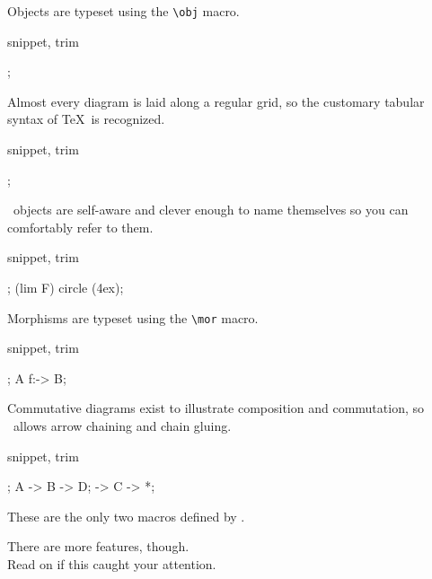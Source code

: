 Objects are typeset using the \lstinline|\obj| macro.

\begin{tcblisting}{snippet, trim}
\begin{codi}
;
\end{codi}
\end{tcblisting}

Almost every diagram is laid along a regular grid,
so the customary tabular syntax of \TeX\ is recognized.

\begin{tcblisting}{snippet, trim}
\begin{codi}
;
\end{codi}
\end{tcblisting}

\CoDi\ objects are self-aware and clever enough to name themselves
so you can comfortably refer to them.

\begin{tcblisting}{snippet, trim}
\begin{codi}
;
\draw (lim F) circle (4ex);
\end{codi}
\end{tcblisting}

Morphisms are typeset using the \lstinline!\mor! macro.

\begin{tcblisting}{snippet, trim}
\begin{codi}
;
\mor A f:-> B;
\end{codi}
\end{tcblisting}

Commutative diagrams exist to illustrate composition and commutation,
so \CoDi\ allows arrow chaining and chain gluing.

\begin{tcblisting}{snippet, trim}
\begin{codi}
;
\mor A -> B -> D;
\mor * -> C -> *;
\end{codi}
\end{tcblisting}

These are the only two macros defined by \CoDi.

There are more features, though.\\
Read on if this caught your attention.

